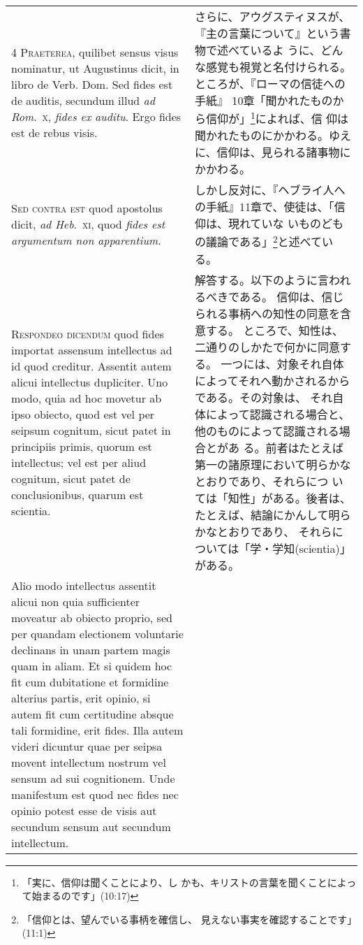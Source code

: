 \documentclass[10pt]{jsarticle} %
\begin{document}
\begin{longtable}{p{21em}p{21em}}
\\


{\scshape 4 Praeterea}, quilibet sensus visus nominatur, ut Augustinus
dicit, in libro de Verb. Dom. Sed fides est de auditis, secundum illud
{\itshape ad Rom}.~{\scshape x}, {\itshape fides ex auditu}. Ergo fides
est de rebus visis.

&

さらに、アウグスティヌスが、『主の言葉について』という書物で述べているよ
 うに、どんな感覚も視覚と名付けられる。ところが、『ローマの信徒への手紙』
 10章「聞かれたものから信仰が」\footnote{「実に、信仰は聞くことにより、し
 かも、キリストの言葉を聞くことによって始まるのです」(10:17)}によれば、信
 仰は聞かれたものにかかわる。ゆえに、信仰は、見られる諸事物にかかわる。

\\


{\scshape Sed contra est} quod apostolus dicit, {\itshape ad
 Heb}.~{\scshape xi}, quod {\itshape fides est argumentum non apparentium}.

&

しかし反対に、『ヘブライ人への手紙』11章で、使徒は、「信仰は、現れていな
 いものどもの議論である」\footnote{「信仰とは、望んでいる事柄を確信し、
 見えない事実を確認することです」(11:1)}と述べている。

\\


{\scshape Respondeo dicendum} quod fides importat assensum intellectus ad
id quod creditur. Assentit autem alicui intellectus dupliciter. Uno
modo, quia ad hoc movetur ab ipso obiecto, quod est vel per seipsum
cognitum, sicut patet in principiis primis, quorum est intellectus; vel
est per aliud cognitum, sicut patet de conclusionibus, quarum est
scientia. 

&

解答する。以下のように言われるべきである。
信仰は、信じられる事柄への知性の同意を含意する。
ところで、知性は、二通りのしかたで何かに同意する。
一つには、対象それ自体によってそれへ動かされるからである。その対象は、
 それ自体によって認識される場合と、他のものによって認識される場合とがあ
 る。前者はたとえば第一の諸原理において明らかなとおりであり、それらにつ
 いては「知性」がある。後者は、たとえば、結論にかんして明らかなとおりであり、
 それらについては「学・学知(scientia)」がある。


\\

Alio modo intellectus assentit alicui non quia sufficienter
moveatur ab obiecto proprio, sed per quandam electionem voluntarie
declinans in unam partem magis quam in aliam. Et si quidem hoc fit cum
dubitatione et formidine alterius partis, erit opinio, si autem fit cum
certitudine absque tali formidine, erit fides. Illa autem videri
dicuntur quae per seipsa movent intellectum nostrum vel sensum ad sui
cognitionem. Unde manifestum est quod nec fides nec opinio potest esse
de visis aut secundum sensum aut secundum intellectum.


\end{longtable}
\end{document}

